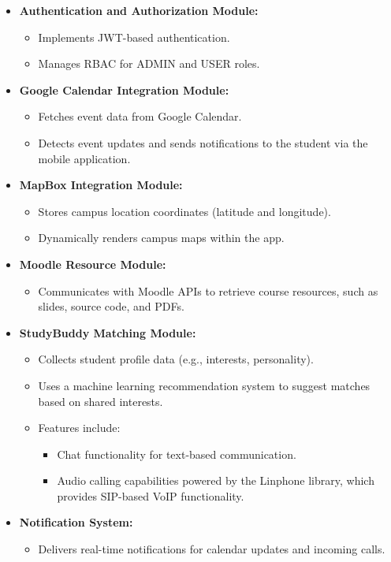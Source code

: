 \documentclass[12pt]{article}
\begin{document}
\begin{itemize}  
    \item \textbf{Authentication and Authorization Module:}  
    \begin{itemize}  
        \item Implements JWT-based authentication.  
        \item Manages RBAC for ADMIN and USER roles.  
    \end{itemize}  

    \item \textbf{Google Calendar Integration Module:}  
    \begin{itemize}  
        \item Fetches event data from Google Calendar.  
        \item Detects event updates and sends notifications to the student via the mobile application.  
    \end{itemize}  

    \item \textbf{MapBox Integration Module:}  
    \begin{itemize}  
        \item Stores campus location coordinates (latitude and longitude).  
        \item Dynamically renders campus maps within the app.  
    \end{itemize}  

    \item \textbf{Moodle Resource Module:}  
    \begin{itemize}  
        \item Communicates with Moodle APIs to retrieve course resources, such as slides, source code, and PDFs.  
    \end{itemize}  

    \item \textbf{StudyBuddy Matching Module:}  
    \begin{itemize}  
        \item Collects student profile data (e.g., interests, personality).  
        \item Uses a machine learning recommendation system to suggest matches based on shared interests.  
        \item Features include:  
        \begin{itemize}  
            \item Chat functionality for text-based communication.  
            \item Audio calling capabilities powered by the Linphone library, which provides SIP-based VoIP functionality.  
        \end{itemize}  
    \end{itemize}  

    \item \textbf{Notification System:}  
    \begin{itemize}  
        \item Delivers real-time notifications for calendar updates and incoming calls.  
    \end{itemize}  
\end{itemize}
\end{document}
